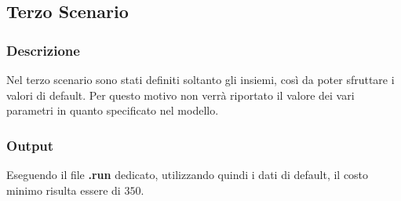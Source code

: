 \subsection{Terzo Scenario}
\subsubsection{Descrizione}
Nel terzo scenario sono stati definiti soltanto gli insiemi, così da poter sfruttare i valori di default. Per questo motivo non verrà riportato il valore dei vari parametri in quanto specificato nel modello.
\subsubsection{Output}
Eseguendo il file \textbf{.run} dedicato, utilizzando quindi i dati di default, il costo minimo risulta essere di \texteuro$350$.